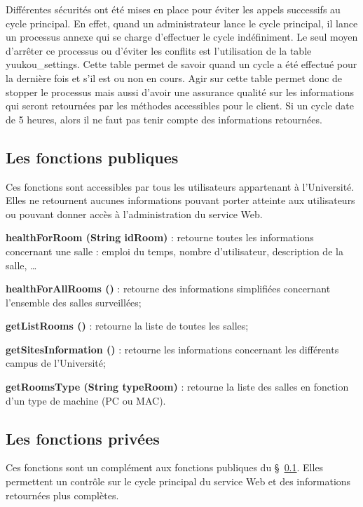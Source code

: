 Diff\'erentes s\'ecurit\'es ont \'et\'e mises en place pour \'eviter les appels successifs au cycle principal.
En effet, quand un administrateur lance le cycle principal, il lance un processus annexe qui se charge d'effectuer le cycle ind\'efiniment.
Le seul moyen d'arr\^eter ce processus ou d'\'eviter les conflits est l'utilisation de la table \textsf{yuukou\_settings}.
Cette table permet de savoir quand un cycle a \'et\'e effectu\'e pour la derni\`ere fois et s'il est ou non en cours.
Agir sur cette table permet donc de stopper le processus mais aussi d'avoir une assurance qualit\'e sur les informations qui seront retourn\'ees par les m\'ethodes accessibles pour le client.
Si un cycle date de 5 heures, alors il ne faut pas tenir compte des informations retourn\'ees.

\subsection{Les fonctions publiques}
\label{section:fonctionsPubliques}

Ces fonctions sont accessibles par tous les utilisateurs appartenant \`a l'Universit\'e.
Elles ne retournent aucunes informations pouvant porter atteinte aux utilisateurs ou pouvant donner acc\`es \`a l'administration du service Web.

\noindent\textbf{healthForRoom (String idRoom)} : retourne toutes les informations concernant une salle : emploi du temps, nombre d'utilisateur, description de la salle, \ldots

\noindent\textbf{healthForAllRooms ()} : retourne des informations simplifi\'ees concernant l'ensemble des salles surveill\'ees;

\noindent\textbf{getListRooms ()} : retourne la liste de toutes les salles;

\noindent\textbf{getSitesInformation ()} : retourne les informations concernant les diff\'erents campus de l'Universit\'e;

\noindent\textbf{getRoomsType (String typeRoom)} : retourne la liste des salles en fonction d'un type de machine (PC ou MAC).

\subsection{Les fonctions priv\'ees}

Ces fonctions sont un compl\'ement aux fonctions publiques du \S~\ref{section:fonctionsPubliques}.
Elles permettent un contr\^ole sur le cycle principal du service Web et des informations retourn\'ees plus compl\`etes.


